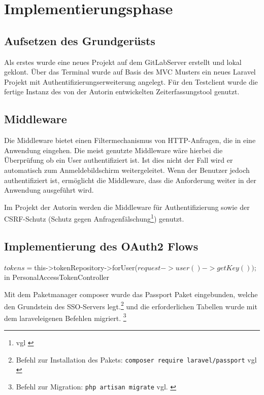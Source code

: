 \section{Implementierungsphase} 
\label{sec:Implementierungsphase}

\subsection{Aufsetzen des Grundgerüsts}
\label{sec:AufsetzenGrundgeruest}

Als erstes wurde eine neues Projekt auf dem GitLabServer erstellt und lokal geklont. Über das Terminal wurde auf Basis des MVC Musters ein neues Laravel Projekt mit Authentifizierungserweiterung angelegt. 
Für den Testclient wurde die fertige Instanz des von der Autorin entwickelten Zeiterfassungstool genutzt.

\subsection{Middleware}
\label{sec:Middleware}
Die Middleware bietet einen Filtermechanismus von HTTP-Anfragen, die in eine Anwendung eingehen. Die meist genutzte Middleware wäre hierbei die Überprüfung ob ein User authentifiziert ist. Ist dies nicht der Fall wird er automatisch zum Anmeldebildschirm weitergeleitet. Wenn der Benutzer jedoch authentifiziert ist, ermöglicht die Middleware, dass die Anforderung weiter in der Anwendung ausgeführt wird.

Im Projekt der Autorin werden die Middleware für Authentifizierung sowie der \acs{CSRF}-Schutz (Schutz gegen Anfragenfälschung\footnote{vgl \cite{CSRF}}) genutzt.

\subsection{Implementierung des OAuth2 Flows}
\label{sec:ImplementierungOAuth2}

$tokens = $this->tokenRepository->forUser($request->user()->getKey());
$
in PersonalAccessTokenController

Mit dem Paketmanager composer wurde das Passport Paket eingebunden, welche den Grundstein des SSO-Servers legt.\footnote{Befehl zur Installation des Pakets: \texttt{composer require laravel/passport} vgl \cite{composer}} und die erforderlichen Tabellen wurde mit dem laraveleigenen Befehlen migriert. \footnote{Befehl zur Migration: \texttt{php artisan migrate} vgl. \cite{Laravel}}

